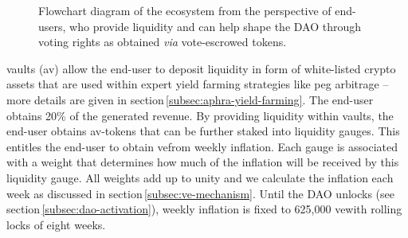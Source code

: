 \begin{figure}[p]
    \vspace*{-2cm}
    \caption{Flowchart diagram of the \aphra ecosystem from the perspective of end-users, who provide liquidity and can help shape the DAO through voting rights as obtained \textit{via} vote-escrowed \aphra tokens.}
    \label{fig:ae-flow}
\end{figure}

\aphra vaults (av) allow the end-user to deposit liquidity in form of white-listed crypto assets that are used within expert yield farming strategies like peg arbitrage -- more details are given in section\,\ref{subsec:aphra-yield-farming}.
The end-user obtains 20\% of the generated revenue.
By providing liquidity within \aphra vaults, the end-user obtains av-tokens that can be further staked into \aphra liquidity gauges.
This entitles the end-user to obtain ve\aphra from weekly inflation.
Each \aphra gauge is associated with a weight that determines how much of the inflation will be received by this liquidity gauge.
All weights add up to unity and we calculate the inflation each week as discussed in section\,\ref{subsec:ve-mechanism}.
Until the DAO unlocks (see section\,\ref{subsec:dao-activation}), weekly inflation is fixed to 625,000 ve\aphra with rolling locks of eight weeks.\\[-1em]

